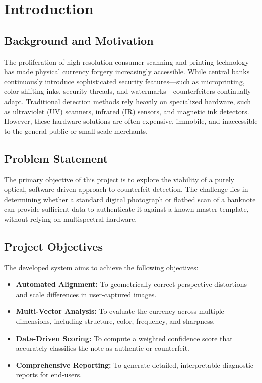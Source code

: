 \documentclass[12pt,a4paper]{article}
\begin{document}
\newpage

\section{Introduction}

\subsection{Background and Motivation}
The proliferation of high-resolution consumer scanning and printing technology has made physical currency forgery increasingly accessible. While central banks continuously introduce sophisticated security features—such as microprinting, color-shifting inks, security threads, and watermarks—counterfeiters continually adapt. Traditional detection methods rely heavily on specialized hardware, such as ultraviolet (UV) scanners, infrared (IR) sensors, and magnetic ink detectors. However, these hardware solutions are often expensive, immobile, and inaccessible to the general public or small-scale merchants.

\subsection{Problem Statement}
The primary objective of this project is to explore the viability of a purely optical, software-driven approach to counterfeit detection. The challenge lies in determining whether a standard digital photograph or flatbed scan of a banknote can provide sufficient data to authenticate it against a known master template, without relying on multispectral hardware.

\subsection{Project Objectives}
The developed system aims to achieve the following objectives:
\begin{itemize}
    \item \textbf{Automated Alignment:} To geometrically correct perspective distortions and scale differences in user-captured images.
    \item \textbf{Multi-Vector Analysis:} To evaluate the currency across multiple dimensions, including structure, color, frequency, and sharpness.
    \item \textbf{Data-Driven Scoring:} To compute a weighted confidence score that accurately classifies the note as authentic or counterfeit.
    \item \textbf{Comprehensive Reporting:} To generate detailed, interpretable diagnostic reports for end-users.
\end{itemize}
\end{document}
